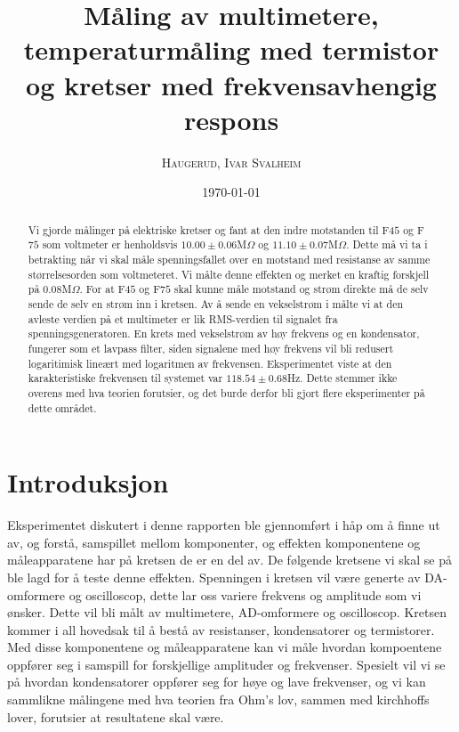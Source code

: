 \documentclass[%
 reprint,
nofootinbib,
aps,
]{revtex4-1}
\begin{document}

\title{Måling av multimetere, temperaturmåling med termistor\\ og kretser med frekvensavhengig respons}

\author{\textsc{Haugerud, Ivar Svalheim}}
%

\date{\today}

\begin{abstract}
Vi gjorde målinger på elektriske kretser og fant at den indre motstanden til F$45$ og F$75$ som voltmeter er henholdsvis $10.00\pm0.06$M$\Omega$ og $11.10\pm0.07$M$\Omega$. Dette må vi ta i betrakting når vi skal måle spenningsfallet over en motstand med resistanse av samme størrelsesorden som voltmeteret. Vi målte denne effekten og merket en kraftig forskjell på $0.08$M$\Omega$. For at F$45$ og F$75$ skal kunne måle motstand og strøm direkte må de selv sende de selv en strøm inn i kretsen. Av å sende en vekselstrøm i målte vi at den avleste verdien på et multimeter er lik RMS-verdien til signalet fra spenningsgeneratoren. En krets med vekselstrøm av høy frekvens og en kondensator, fungerer som et lavpass filter, siden signalene med høy frekvens vil bli redusert logaritimisk lineært med logaritmen av frekvensen. Eksperimentet viste at den karakteristiske frekvensen til systemet var $118.54 \pm  0.68$Hz. Dette stemmer ikke overens med hva teorien forutsier, og det burde derfor bli gjort flere eksperimenter på dette området.
\end{abstract}

\maketitle

\section{\label{introduksjon}Introduksjon}
Eksperimentet diskutert i denne rapporten ble gjennomført i håp om å finne ut av, og forstå, samspillet mellom komponenter, og effekten komponentene og måleapparatene har på kretsen de er en del av. De følgende kretsene vi skal se på ble lagd for å teste denne effekten. Spenningen i kretsen vil være generte av DA-omformere og oscilloscop, dette lar oss variere frekvens og amplitude som vi ønsker. Dette vil bli målt av multimetere, AD-omformere og oscilloscop. Kretsen kommer i all hovedsak til å bestå av resistanser, kondensatorer og termistorer. Med disse komponentene og måleapparatene kan vi måle hvordan kompoentene oppfører seg i samspill for forskjellige amplituder og frekvenser. Spesielt vil vi se på hvordan kondensatorer oppfører seg for høye og lave frekvenser, og vi kan sammlikne målingene med hva teorien fra Ohm's lov, sammen med kirchhoffs lover, forutsier at resultatene skal være.
\end{document}
